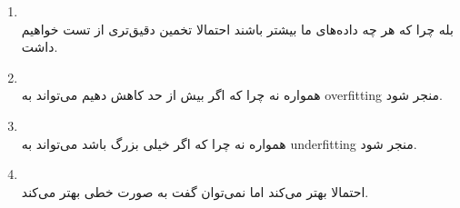 \noindent

\begin{enumerate}
 \item \phantom{text}
 \\
 بله چرا که هر چه داده‌های ما بیشتر باشند احتمالا تخمین دقیق‌تری از تست خواهیم داشت.
 \item \phantom{text}
 \\
 همواره نه چرا که اگر بیش از حد کاهش دهیم می‌تواند به overfitting منجر شود.
 \item \phantom{text}
 \\
 همواره نه چرا که اگر خیلی بزرگ باشد می‌تواند به underfitting منجر شود.
 \item \phantom{text}
 \\
 احتمالا بهتر می‌کند اما نمی‌توان گفت به صورت خطی بهتر می‌کند.
\end{enumerate}


